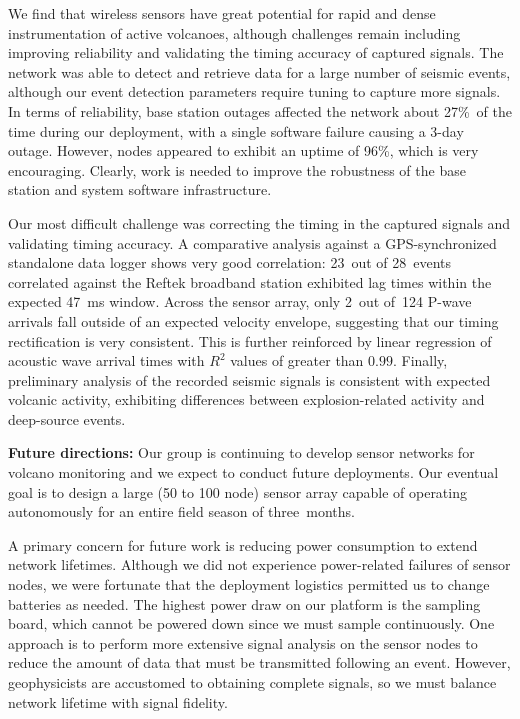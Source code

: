 We find that wireless sensors have great potential for
rapid and dense instrumentation of active volcanoes, although challenges 
remain including improving reliability and validating the timing 
accuracy of captured signals. The network was able to detect and
retrieve data for a large number of seismic events, although our event
detection parameters require tuning to capture more signals.
In terms of reliability, base station outages affected the network about 
27\%~of the time during our deployment, with a single software failure 
causing a 3-day outage. However, nodes appeared to exhibit an uptime of
96\%, which is very encouraging. Clearly, work is needed to improve 
the robustness of the base station and system software infrastructure.


Our most difficult challenge was correcting the timing in the captured
signals and validating timing accuracy. A comparative analysis against a
GPS-synchronized standalone data logger shows very good correlation: 23~out
of 28~events correlated against the Reftek broadband station exhibited lag
times within the expected 47~ms window.  Across the sensor array, only 2~out
of~124 P-wave arrivals fall outside of an expected velocity envelope,
suggesting that our timing rectification is very consistent.  This is further
reinforced by linear regression of acoustic wave arrival times with $R^2$
values of greater than $0.99$.  Finally, preliminary analysis of the recorded
seismic signals is consistent with expected volcanic activity, exhibiting
differences between explosion-related activity and deep-source events.

{\bf Future directions:} Our group is continuing to develop sensor networks
for volcano monitoring and we expect to conduct future deployments. Our eventual goal is to design a large (50 to 100 node) sensor
array capable of operating autonomously for an entire field season
of three~months.

A primary concern for future work is reducing power consumption to
extend network lifetimes. Although we did not experience power-related
failures of sensor nodes, we were fortunate that the deployment logistics
permitted us to change batteries as needed. The highest power draw on
our platform is the sampling board, which cannot be powered down since
we must sample continuously. One approach is to perform more extensive
signal analysis on the sensor nodes to reduce the amount of data 
that must be transmitted following an event. However, geophysicists
are accustomed to obtaining complete signals, so we must balance 
network lifetime with signal fidelity. 

